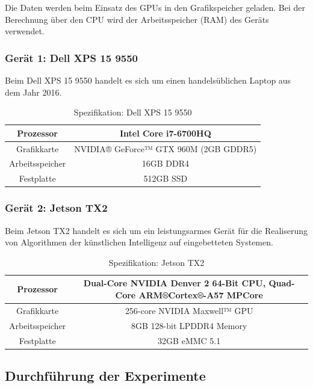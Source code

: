 Die Daten werden beim Einsatz des GPUs in den Grafikspeicher geladen. Bei der Berechnung über den CPU wird der Arbeitsspeicher (RAM) des Geräts verwendet.

\subsubsection{Gerät 1: Dell XPS 15 9550}

Beim Dell XPS 15 9550 handelt es sich um einen handelsüblichen Laptop aus dem Jahr 2016.

\begin{table}[H]
    \centering
    \begin{tabular}{ |c|c| }
        \hline
        Prozessor       & Intel Core i7-6700HQ \\ \hline
        Grafikkarte     & NVIDIA® GeForce™ GTX 960M (2GB GDDR5) \\ \hline
        Arbeitsspeicher & 16GB DDR4  \\ \hline
        Festplatte      & 512GB SSD \\ \hline
    \end{tabular}
    \caption{Spezifikation: Dell XPS 15 9550}
    \label{tab:xps15}
\end{table}

\subsubsection{Gerät 2: Jetson TX2}

Beim Jetson TX2 handelt es sich um ein leistungsarmes Gerät für die Realiserung von Algorithmen der künstlichen Intelligenz auf eingebetteten Systemen.

\begin{table}[H]
    \centering
    \begin{tabular}{ |c|c| }
        \hline
        Prozessor       & Dual-Core NVIDIA Denver 2 64-Bit CPU, Quad-Core ARM®Cortex®-A57 MPCore \\ \hline
        Grafikkarte     & 256-core NVIDIA Maxwell™ GPU \\ \hline
        Arbeitsspeicher & 8GB 128-bit LPDDR4 Memory  \\ \hline
        Festplatte      & 32GB eMMC 5.1 \\ \hline
    \end{tabular}
    \caption{Spezifikation: Jetson TX2}
    \label{tab:jetson_tx1}
\end{table}

\subsection{Durchführung der Experimente}

